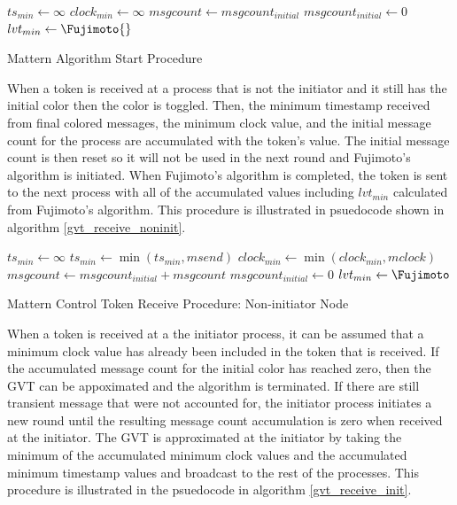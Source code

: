 \documentclass[11pt]{book}
\begin{document}
\begin{algorithm}
\DontPrintSemicolon
\SetAlgoVlined
{}
     
    $ts_{min} \gets \infty$\;
    $clock_{min} \gets \infty$
    $msgcount \gets msgcount_{initial}$\;
    $msgcount_{initial} \gets 0$\;
    $lvt_{min} \gets \Fujimoto{}$\;
    \;
\caption{Mattern Algorithm Start Procedure}\label{gvt_start}
\end{algorithm}

When a token is received at a process that is not the initiator and it still has the initial
color then the color is toggled. Then, the minimum timestamp received from final colored
messages, the minimum clock value, and the initial message count for the process are
accumulated with the token's value. The initial message count is then reset so it will not
be used in the next round and Fujimoto's algorithm is initiated. When Fujimoto's algorithm
is completed, the token is sent to the next process with all of the accumulated values
including $lvt_{min}$ calculated from Fujimoto's algorithm. This procedure is illustrated
in psuedocode shown in algorithm \ref{gvt_receive_noninit}.

\begin{algorithm}
\DontPrintSemicolon
\SetAlgoVlined
{}
     {
        $ts_{min} \gets \infty$\;
         
    }
    $ts_{min} \gets \min{(ts_{min}, msend)}$\;
    $clock_{min} \gets \min{(clock_{min}, mclock)}$\;
    $msgcount \gets msgcount_{initial} + msgcount$\;
    $msgcount_{initial} \gets 0$\;
    $lvt_{min} \gets \Fujimoto$\;
    \;
\caption{Mattern Control Token Receive Procedure: Non-initiator Node}\label{gvt_receive_noninit}
\end{algorithm}

When a token is received at a the initiator process, it can be assumed that a minimum clock
value has already been included in the token that is received. If the accumulated message count
for the initial color has reached zero, then the GVT can be appoximated and the algorithm
is terminated. If there are still transient message that were not accounted for, the initiator
process initiates a new round until the resulting message count accumulation is zero
when received at the initiator. The GVT is approximated at the initiator by taking the
minimum of the accumulated minimum clock values and the accumulated minimum timestamp values
and broadcast to the rest of the processes. This procedure is illustrated in the psuedocode
in algorithm \ref{gvt_receive_init}.
\end{document}
